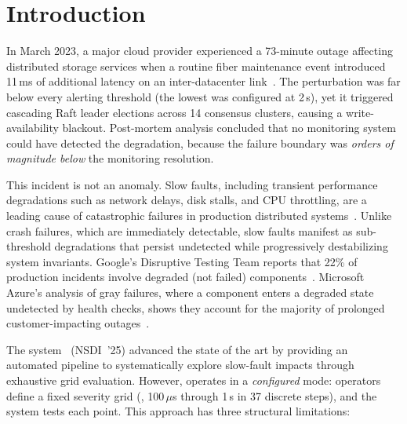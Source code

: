 \section{Introduction}
\label{sec:intro}

In March 2023, a major cloud provider experienced a 73-minute outage affecting
distributed storage services when a routine fiber maintenance event introduced
11\,ms of additional latency on an inter-datacenter link~\cite{huang-gray-failure}.
The perturbation was far below every alerting threshold (the lowest was configured
at 2\,s), yet it triggered cascading Raft leader elections across 14 consensus
clusters, causing a write-availability blackout. Post-mortem analysis concluded
that no monitoring system could have detected the degradation, because the
failure boundary was \emph{orders of magnitude below} the monitoring resolution.

This incident is not an anomaly. Slow faults, including transient performance
degradations such as network delays, disk stalls, and CPU
throttling, are a leading cause of catastrophic failures in production
distributed systems~\cite{xinda,gunawi-cbs}. Unlike crash failures, which are
immediately detectable, slow faults manifest as sub-threshold degradations that
persist undetected while progressively destabilizing system invariants.
Google's Disruptive Testing Team reports that 22\% of production incidents
involve degraded (not failed) components~\cite{google-sre-book}. Microsoft
Azure's analysis of gray failures, where a component enters a degraded state
undetected by health checks, shows they account for the majority of prolonged
customer-impacting outages~\cite{huang-gray-failure}.

The \xinda{} system~\cite{xinda} (NSDI~'25) advanced the state of the art by
providing an automated pipeline to systematically explore slow-fault impacts
through exhaustive grid evaluation. However, \xinda{} operates in a
\emph{configured} mode: operators define a fixed severity grid (\eg{},
100\,$\mu$s through 1\,s in 37 discrete steps), and the system tests each
point. This approach has three structural limitations:

